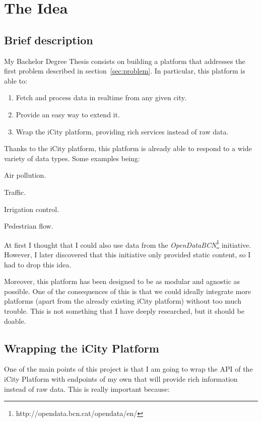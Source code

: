 
\section{The Idea}

\subsection{Brief description}
\label{sec:description}

My Bachelor Degree Thesis consists on building a platform that addresses the
first problem described in section~\ref{sec:problem}. In particular, this
platform is able to:

\begin{enumerate}
  \itemsep0em
  \item Fetch and process data in realtime from any given city.
  \item Provide an easy way to extend it.
  \item Wrap the iCity platform, providing rich services instead of raw data.
\end{enumerate}

Thanks to the iCity platform, this platform is already able to respond to a
wide variety of data types. Some examples being:

\mylist
  \item Air pollution.
  \item Traffic.
  \item Irrigation control.
  \item Pedestrian flow.
\mylistend

At first I thought that I could also use data from the {\it
OpenDataBCN}\footnote{http://opendata.bcn.cat/opendata/en/} initiative.
However, I later discovered that this initiative only provided static content,
so I had to drop this idea.

Moreover, this platform has been designed to be as modular and agnostic as
possible. One of the consequences of this is that we could ideally integrate
more platforms (apart from the already existing iCity platform) without too much
trouble. This is not something that I have deeply researched, but it should be
doable.

\subsection{Wrapping the iCity Platform}

One of the main points of this project is that I am going to wrap the API of
the iCity Platform with endpoints of my own that will provide rich information
instead of raw data. This is really important because:

